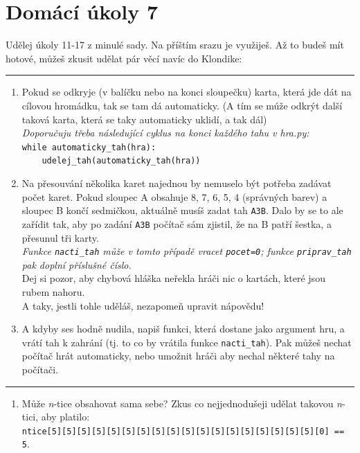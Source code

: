 \documentclass[a4paper,10pt]{article}
\newcommand\plsetno{7}
\begin{document}
\section*{Domácí úkoly \plsetno}

Udělej úkoly 11-17 z minulé sady. Na příštím srazu je využiješ.
Až to budeš mít hotové, můžeš zkusit udělat pár věcí navíc do Klondike:

\bigskip\bigskip
\hrule

\begin{enumerate}

\item Pokud se odkryje (v balíčku nebo na konci sloupečku) karta, která jde dát
    na cílovou hromádku, tak se tam dá automaticky.
    (A tím se múže odkrýt další taková karta, která se taky automaticky
    uklidí, a tak dál)
    \\\emph{Doporučuju třeba následující cyklus na konci každého tahu v hra.py:}
    \\\verb+while automaticky_tah(hra):+
    \\\verb+    udelej_tah(automaticky_tah(hra))+

\item Na přesouvání několika karet najednou by nemuselo být potřeba zadávat
    počet karet. Pokud sloupec A obsahuje 8, 7, 6, 5, 4 (správných barev)
    a sloupec B končí sedmičkou, aktuálně musíš zadat tah \verb+A3B+.
    Dalo by se to ale zařídit tak, aby po zadání \verb+A3B+ počítač
    sám zjistil, že na B patří šestka, a přesunul tři karty.
    \\\emph{Funkce \texttt{nacti\_tah} může v tomto případě vracet \texttt{pocet=0};
            funkce \texttt{priprav\_tah} pak doplní příslušné číslo.}
    \\Dej si pozor, aby chybová hláška neřekla hráči nic o kartách, které jsou
    rubem nahoru.
    \\A taky, jestli tohle uděláš, nezapomeň upravit nápovědu!

\item A kdyby ses hodně nudila, napiš funkci, která dostane jako argument hru,
    a vrátí tah k zahrání (tj. to co by vrátila funkce \verb+nacti_tah+).
    Pak můžeš nechat počítač hrát automaticky, nebo umožnit hráči
    aby nechal některé tahy na počítači.

\end{enumerate}

\hrule

\begin{enumerate}[resume]

\item Může \emph{n}-tice obsahovat sama sebe? Zkus co nejjednodušeji udělat takovou \emph{n}-tici, aby platilo:
    \\\verb+ntice[5][5][5][5][5][5][5][5][5][5][5][5][5][5][5][5][5][5][0] == 5+.

\end{enumerate}
\end{document}
